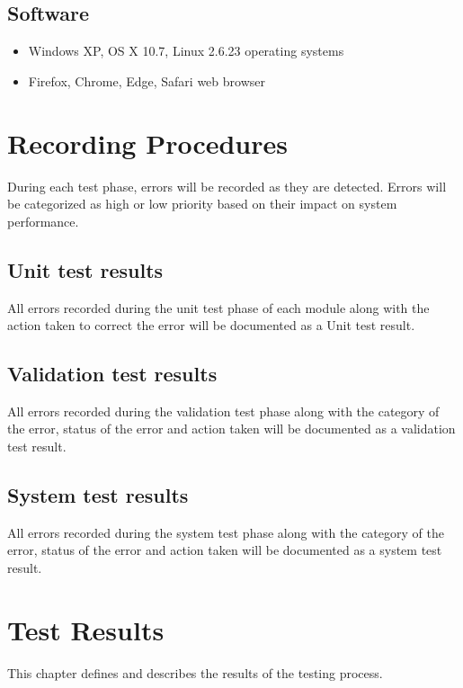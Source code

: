 \documentclass{scrreprt}
\begin{document}
	\section{Software}
	\begin{itemize}
		\item Windows XP, OS X 10.7, Linux 2.6.23 operating systems
		\item Firefox, Chrome, Edge, Safari web browser
	\end{itemize}

	{\let\clearpage\relax \chapter{Recording Procedures}}
	During each test phase, errors will be recorded as they are detected. Errors will be categorized as high or low priority based on their impact on system performance.
	\section{Unit test results}
	All errors recorded during the unit test phase of each module along with the action taken to correct the error will be documented as a Unit test result.

	\section{Validation test results}
	All errors recorded during the validation test phase along with the category of the error, status of the error and action taken will be documented as a validation test result.
	
	\section{System test results}
	All errors recorded during the system test phase along with the category of the error, status of the error and action taken will be documented as a system test result.
	
	

	{\let\clearpage\relax \chapter{Test Results}}
	This chapter defines and describes the results of the testing process.
	
\end{document}
